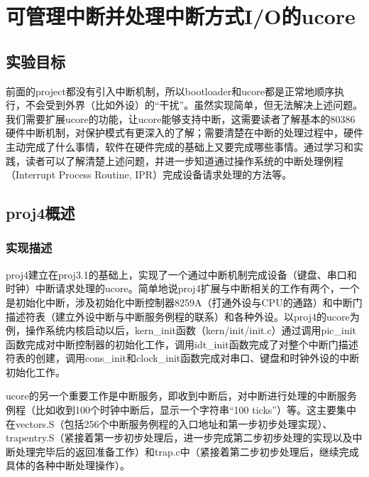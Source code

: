 \section{可管理中断并处理中断方式I/O的ucore}\label{ux53efux7ba1ux7406ux4e2dux65adux5e76ux5904ux7406ux4e2dux65adux65b9ux5f0fioux7684ucore}

\subsection{实验目标}\label{ux5b9eux9a8cux76eeux6807}

前面的project都没有引入中断机制，所以bootloader和ucore都是正常地顺序执行，不会受到外界（比如外设）的``干扰''。虽然实现简单，但无法解决上述问题。我们需要扩展ucore的功能，让ucore能够支持中断，这需要读者了解基本的80386硬件中断机制，对保护模式有更深入的了解；需要清楚在中断的处理过程中，硬件主动完成了什么事情，软件在硬件完成的基础上又要完成哪些事情。通过学习和实践，读者可以了解清楚上述问题，并进一步知道通过操作系统的中断处理例程（Interrupt
Process Routine, IPR）完成设备请求处理的方法等。

\subsection{proj4概述}\label{proj4ux6982ux8ff0}

\subsubsection{实现描述}\label{ux5b9eux73b0ux63cfux8ff0}

proj4建立在proj3.1的基础上，实现了一个通过中断机制完成设备（键盘、串口和时钟）中断请求处理的ucore。简单地说proj4扩展与中断相关的工作有两个，一个是初始化中断，涉及初始化中断控制器8259A（打通外设与CPU的通路）和中断门描述符表（建立外设中断与中断服务例程的联系）和各种外设。以proj4的ucore为例，操作系统内核启动以后，kern\_init函数（kern/init/init.c）通过调用pic\_init函数完成对中断控制器的初始化工作，调用idt\_init函数完成了对整个中断门描述符表的创建，调用cons\_init和clock\_init函数完成对串口、键盘和时钟外设的中断初始化工作。

ucore的另一个重要工作是中断服务，即收到中断后，对中断进行处理的中断服务例程（比如收到100个时钟中断后，显示一个字符串``100
ticks''）等。这主要集中在vectors.S（包括256个中断服务例程的入口地址和第一步初步处理实现）、trapentry.S（紧接着第一步初步处理后，进一步完成第二步初步处理的实现以及中断处理完毕后的返回准备工作）和trap.c中（紧接着第二步初步处理后，继续完成具体的各种中断处理操作）。

